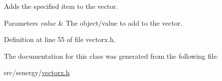 Adds the specified item to the vector. 


\begin{DoxyParams}{Parameters}
{\em value} & The object/value to add to the vector. \\
\hline
\end{DoxyParams}


Definition at line 55 of file vectorx.\-h.



The documentation for this class was generated from the following file\-:\begin{DoxyCompactItemize}
\item 
src/senergy/\hyperlink{vectorx_8h}{vectorx.\-h}\end{DoxyCompactItemize}
